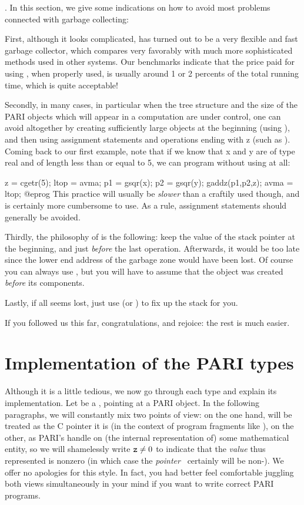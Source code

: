 . In this section, we give some indications
on how to avoid most problems connected with garbage collecting:

First, although it looks complicated,  has turned out to be a
very flexible and fast garbage collector, which compares very favorably
with much more sophisticated methods used in other systems. Our benchmarks
indicate that the price paid for using , when properly used, is
usually around 1 or 2 percents of the total running time, which is quite
acceptable!

Secondly, in many cases, in particular when the tree structure and the size of
the PARI objects which will appear in a computation are under control, one
can avoid  altogether by creating sufficiently large objects at
the beginning (using ), and then using assignment statements and
operations ending with z (such as ). Coming back to our first
example, note that if we know that x and y are of type real and of length
less than or equal to 5, we can program without using  at all:

\bprog
  z = cgetr(5); ltop = avma;
  p1 = gsqr(x); p2 = gsqr(y); gaddz(p1,p2,z);
  avma = ltop;
@eprog
\noindent This practice will usually be \emph{slower} than a craftily used
 though, and is certainly more cumbersome to use. As a rule,
assignment statements should generally be avoided.
\smallskip

Thirdly, the philosophy of  is the following: keep the value of
the stack pointer  at the beginning, and just \emph{before} the
last operation.  Afterwards, it would be too late since the lower end address
of the garbage zone would have been lost. Of course you can always use
, but you will have to assume that the object was created
\emph{before} its components.

Lastly, if all seems lost, just use  (or )
to fix up the stack for you.

\smallskip If you followed us this far, congratulations, and rejoice: the
rest is much easier.

\section{Implementation of the PARI types}
\label{se:impl}

\noindent
Although it is a little tedious, we now go through each type and explain its
implementation. Let  be a , pointing at a PARI object. In
the following paragraphs, we will constantly mix two points of view: on the
one hand,  will be treated as the C pointer it is (in the context of
program fragments like ), on the other, as PARI's handle on (the
internal representation of) some mathematical entity, so we will shamelessly
write ${\tt z} \ne 0$ to indicate that the \emph{value} thus represented
is nonzero (in which case the \emph{pointer}~ certainly will be
non-). We offer no apologies for this style. In fact, you had
better feel comfortable juggling both views simultaneously in your mind if
you want to write correct PARI programs.

